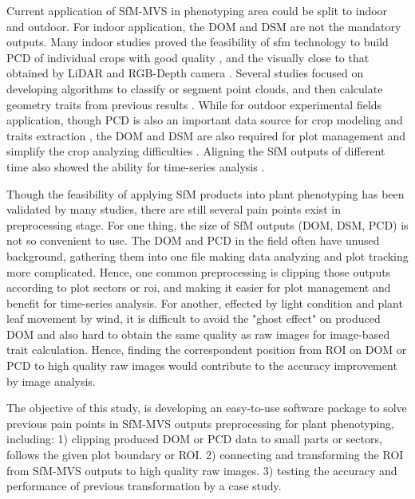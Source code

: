 \documentclass{configs/bmcart}
\begin{document}
Current application of SfM-MVS in phenotyping area could be split to indoor and outdoor. For indoor application, the DOM and DSM are not the mandatory outputs. Many indoor studies proved the feasibility of \acrshort*{sfm} technology to build PCD of individual crops with good quality \cite{wang_maize_2019, rossi_performances_2020}, and the visually close to that obtained by LiDAR \cite{thapa_novel_2018} and RGB-Depth camera \cite{martinez-guanter_low-cost_2019}. Several studies focused on developing algorithms to classify or segment point clouds, and then calculate geometry traits from previous results \cite{ziamtsov_machine_2019, artzet_phenomenal_2019}. While for outdoor experimental fields application, though PCD is also an important data source for crop modeling and traits extraction \cite{jay_field_2015, sun_three-dimensional_2020, zhu_quantification_2020}, the DOM and DSM are also required for plot management and simplify the crop analyzing difficulties \cite{sun_field_2018, tresch_easympe_2019, chen_grid_2020}. Aligning the SfM outputs of different time also showed the ability for time-series analysis \cite{dong_4d_2017, han_clustering_2018}.

Though the feasibility of applying SfM products into plant phenotyping has been validated by many studies, there are still several pain points exist in preprocessing stage. For one thing, the size of SfM outputs (DOM, DSM, PCD) is not so convenient to use. The DOM and PCD in the field often have unused background, gathering them into one file making data analyzing and plot tracking more complicated. Hence, one common preprocessing is clipping those outputs according to plot sectors or \acrfull*{roi}, and making it easier for plot management and benefit for time-series analysis. For another, effected by light condition and plant leaf movement by wind, it is difficult to avoid the "ghost effect" on produced DOM and also hard to obtain the same quality as raw images for image-based trait calculation. Hence, finding the correspondent position from ROI on DOM or PCD to high quality raw images would contribute to the accuracy improvement by image analysis.

The objective of this study, is developing an easy-to-use software package to solve previous pain points in SfM-MVS outputs preprocessing for plant phenotyping, including: 1) clipping produced DOM or PCD data to small parts or sectors, follows the given plot boundary or ROI. 2) connecting and transforming the ROI from SfM-MVS outputs to high quality raw images. 3) testing the accuracy and performance of previous transformation by a case study.
\end{document}
